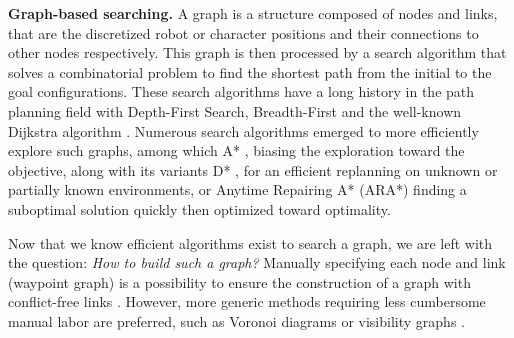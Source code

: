 \noindent\textbf{Graph-based searching.}
A graph is a structure composed of nodes and links, that are the discretized robot or character positions and their connections to other nodes respectively.
This graph is then processed by a search algorithm that solves a combinatorial problem to find the shortest path from the initial to the goal configurations. 
These search algorithms have a long history in the path planning field with Depth-First Search, Breadth-First and the well-known Dijkstra algorithm \cite{dijkstra_1959}. 
Numerous search algorithms emerged to more efficiently explore such graphs, among which A* \cite{A_star_1968}, biasing the exploration toward the objective, along with its variants D* \cite{D_star_1994}, for an efficient replanning on unknown or partially known environments, or Anytime Repairing A* (ARA*) \cite{ara_star_2003} finding a suboptimal solution quickly then optimized toward optimality.

Now that we know efficient algorithms exist to search a graph, we are left with the question: \textit{How to build such a graph?}
Manually specifying each node and link (waypoint graph) is a possibility to ensure the construction of a graph with conflict-free links \cite{waypoints_graph_lars_2002}.%
However, more generic methods requiring less cumbersome manual labor are preferred, such as Voronoi diagrams \cite{voronoi_example_2007} or visibility graphs \cite{visiblity_graph_example_2004}. \\


